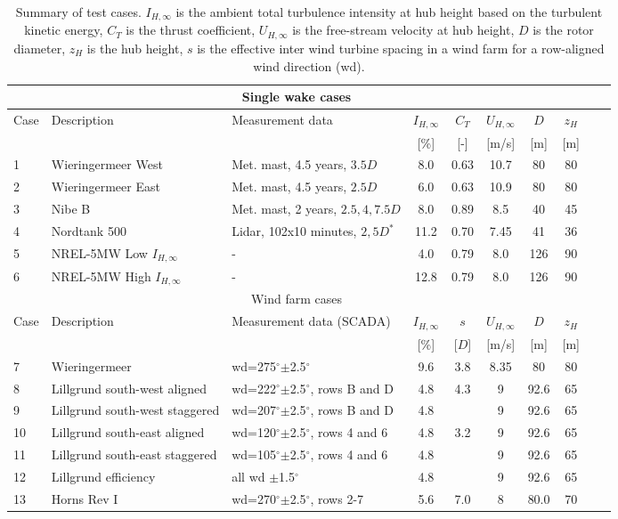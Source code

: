 \documentclass[a4paper,oneside]{article}
\newcommand{\degree}{\ensuremath{^\circ}}
\begin{document}
\begin{table}[h!]
\centering
\small
\begin{tabular}{lllccccccc}
\multicolumn{8}{c}{Single wake cases}\\
\hline
Case & Description & Measurement data & $I_{H,\infty}$ & $C_T$  &   $U_{H,\infty}$     & $D$  & $z_H$ \\
     &	           &		      &	 [\%]	        & [-]      & [m/s] 		& [m]  & [m] \\
\hline
1 & Wieringermeer West 		& Met. mast, 4.5 years, $3.5D$ 		& 8.0  & 0.63  & 10.7 & 80 & 80\\
2 & Wieringermeer East  	& Met. mast, 4.5 years, $2.5D$ 		& 6.0  & 0.63  & 10.9 & 80 & 80\\
3 & Nibe B 			& Met. mast, 2 years, $2.5,4,7.5D$ 	& 8.0 & 0.89  &  8.5 & 40 & 45\\
4 & Nordtank 500 		& Lidar, 102x10 minutes, $2, 5D^*$		& 11.2 & 0.70  & 7.45 & 41 & 36\\ 
5 & NREL-5MW Low $I_{H,\infty}$ & -  					& 4.0 & 0.79 &8.0 & 126 & 90\\ 
6 & NREL-5MW High $I_{H,\infty}$& -  					& 12.8 & 0.79 &8.0 & 126 & 90\\
\hline
\multicolumn{8}{c}{Wind farm cases}\\
\hline
Case & Description & Measurement data (SCADA) & $I_{H,\infty}$ & $s$  &   $U_{H,\infty}$     & $D$  & $z_H$ & \\
     &	           &		      &	 [\%]	      &  [$D$]      & [m/s] 		& [m]  & [m] \\
\hline
7 & Wieringermeer 		& wd=275\degree$\pm$2.5\degree  & 9.6 & 3.8 & 8.35			& 80	& 80 	 	\\
8 & Lillgrund south-west aligned  &wd=222\degree$\pm$2.5\degree, rows B and D  & 4.8 & 4.3	& 9			& 92.6	& 65 	\\
9 & Lillgrund south-west staggered &wd=207\degree$\pm$2.5\degree, rows B and D & 4.8 &  & 9			& 92.6	& 65    \\
10 & Lillgrund south-east aligned  &wd=120\degree$\pm$2.5\degree, rows 4 and 6 & 4.8 	& 3.2 & 9			& 92.6	& 65 	\\
11 & Lillgrund south-east staggered &wd=105\degree$\pm$2.5\degree, rows 4 and 6 & 4.8 &   	& 9			& 92.6	& 65 	 \\
12 & Lillgrund efficiency           & all wd $\pm$1.5\degree & 4.8 &         & 9                     & 92.6  & 65     \\
13 & Horns Rev I                    &wd=270\degree$\pm$2.5\degree, rows 2-7     & 5.6 	& 7.0 & 8			& 80.0	& 70 	\\
\end{tabular}
\caption{Summary of test cases. $I_{H,\infty}$ is the ambient total turbulence intensity at hub height based on the turbulent kinetic energy, $C_T$ is the thrust coefficient, $U_{H,\infty}$ is the free-stream velocity at hub height, $D$ is the rotor diameter, $z_H$ is the hub height, $s$ is the effective inter wind turbine spacing in a wind farm for a row-aligned wind direction (wd).}\label{tab:cases}
\end{table}
\end{document}
